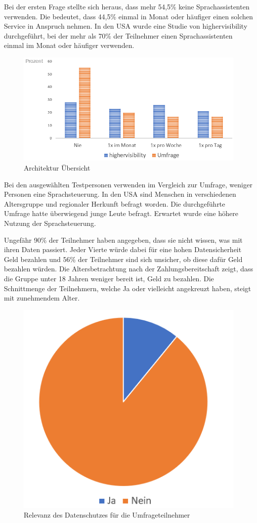 Bei der ersten Frage stellte sich heraus, dass mehr 54,5\% keine Sprachassistenten verwenden. Die bedeutet, dass 44,5\% einmal in Monat oder häufiger einen solchen Service in Anspruch nehmen. In den USA wurde eine Studie von highervisibility durchgeführt, bei der mehr als 70\% der Teilnehmer einen Sprachassistenten einmal im Monat oder häufiger verwenden\cite{highervisibility}.

\begin{figure}[h!]
	\centering
	\includegraphics[width=0.7\linewidth]{Picture/umfrage_haeufigkeit}
	\caption[Architektur Übersicht]{Architektur Übersicht}
	\label{fig:umfrage_haeufigkeit}
\end{figure}

Bei den ausgewählten Testpersonen verwenden im Vergleich zur Umfrage, weniger Personen eine Sprachsteuerung. In den USA sind Menschen in verschiedenen Altersgruppe und regionaler Herkunft befragt worden. Die durchgeführte Umfrage hatte überwiegend junge Leute befragt. Erwartet wurde eine höhere Nutzung der Sprachsteuerung. 


Ungefähr 90\% der Teilnehmer haben angegeben, dass sie nicht wissen, was mit ihren Daten passiert. Jeder Vierte würde dabei für eine hohen Datensicherheit Geld bezahlen und 56\% der Teilnehmer sind sich unsicher, ob diese dafür Geld bezahlen würden. Die Altersbetrachtung nach der Zahlungsbereitschaft zeigt, dass die Gruppe unter 18 Jahren weniger bereit ist, Geld zu bezahlen. Die Schnittmenge der Teilnehmern, welche Ja oder vielleicht angekreuzt haben, steigt mit zunehmendem Alter.

\begin{figure}
	\centering
	\includegraphics[width=0.5\linewidth]{Picture/umfrage_datenschutz}
	\caption[Relevanz des Datenschutzes für die Umfrageteilnehmer]{Relevanz des Datenschutzes für die Umfrageteilnehmer}
	\label{fig:umfrage_datenschutz}
\end{figure}




